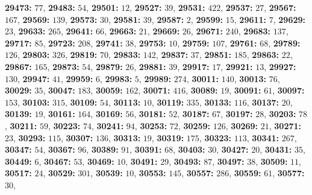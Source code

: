 \textsf{\bfseries 29473:} $77$, \textsf{\bfseries 29483:} $54$, \textsf{\bfseries 29501:} $12$, \textsf{\bfseries 29527:} $39$, \textsf{\bfseries 29531:} $422$, \textsf{\bfseries 29537:} $27$, \textsf{\bfseries 29567:} $167$, \textsf{\bfseries 29569:} $139$, \textsf{\bfseries 29573:} $30$, \textsf{\bfseries 29581:} $39$, \textsf{\bfseries 29587:} $2$, \textsf{\bfseries 29599:} $15$, \textsf{\bfseries 29611:} $7$, \textsf{\bfseries 29629:} $23$, \textsf{\bfseries 29633:} $265$, \textsf{\bfseries 29641:} $66$, \textsf{\bfseries 29663:} $21$, \textsf{\bfseries 29669:} $26$, \textsf{\bfseries 29671:} $240$, \textsf{\bfseries 29683:} $137$, \textsf{\bfseries 29717:} $85$, \textsf{\bfseries 29723:} $208$, \textsf{\bfseries 29741:} $38$, \textsf{\bfseries 29753:} $10$, \textsf{\bfseries 29759:} $107$, \textsf{\bfseries 29761:} $68$, \textsf{\bfseries 29789:} $126$, \textsf{\bfseries 29803:} $326$, \textsf{\bfseries 29819:} $70$, \textsf{\bfseries 29833:} $142$, \textsf{\bfseries 29837:} $37$, \textsf{\bfseries 29851:} $185$, \textsf{\bfseries 29863:} $22$, \textsf{\bfseries 29867:} $165$, \textsf{\bfseries 29873:} $54$, \textsf{\bfseries 29879:} $26$, \textsf{\bfseries 29881:} $39$, \textsf{\bfseries 29917:} $17$, \textsf{\bfseries 29921:} $13$, \textsf{\bfseries 29927:} $130$, \textsf{\bfseries 29947:} $41$, \textsf{\bfseries 29959:} $6$, \textsf{\bfseries 29983:} $5$, \textsf{\bfseries 29989:} $274$, \textsf{\bfseries 30011:} $140$, \textsf{\bfseries 30013:} $76$, \textsf{\bfseries 30029:} $35$, \textsf{\bfseries 30047:} $183$, \textsf{\bfseries 30059:} $162$, \textsf{\bfseries 30071:} $416$, \textsf{\bfseries 30089:} $19$, \textsf{\bfseries 30091:} $61$, \textsf{\bfseries 30097:} $153$, \textsf{\bfseries 30103:} $315$, \textsf{\bfseries 30109:} $54$, \textsf{\bfseries 30113:} $10$, \textsf{\bfseries 30119:} $335$, \textsf{\bfseries 30133:} $116$, \textsf{\bfseries 30137:} $20$, \textsf{\bfseries 30139:} $19$, \textsf{\bfseries 30161:} $164$, \textsf{\bfseries 30169:} $56$, \textsf{\bfseries 30181:} $52$, \textsf{\bfseries 30187:} $67$, \textsf{\bfseries 30197:} $28$, \textsf{\bfseries 30203:} $78$, \textsf{\bfseries 30211:} $59$, \textsf{\bfseries 30223:} $74$, \textsf{\bfseries 30241:} $94$, \textsf{\bfseries 30253:} $72$, \textsf{\bfseries 30259:} $126$, \textsf{\bfseries 30269:} $21$, \textsf{\bfseries 30271:} $23$, \textsf{\bfseries 30293:} $115$, \textsf{\bfseries 30307:} $136$, \textsf{\bfseries 30313:} $19$, \textsf{\bfseries 30319:} $175$, \textsf{\bfseries 30323:} $113$, \textsf{\bfseries 30341:} $267$, \textsf{\bfseries 30347:} $54$, \textsf{\bfseries 30367:} $96$, \textsf{\bfseries 30389:} $91$, \textsf{\bfseries 30391:} $68$, \textsf{\bfseries 30403:} $30$, \textsf{\bfseries 30427:} $20$, \textsf{\bfseries 30431:} $35$, \textsf{\bfseries 30449:} $6$, \textsf{\bfseries 30467:} $53$, \textsf{\bfseries 30469:} $10$, \textsf{\bfseries 30491:} $29$, \textsf{\bfseries 30493:} $87$, \textsf{\bfseries 30497:} $38$, \textsf{\bfseries 30509:} $11$, \textsf{\bfseries 30517:} $24$, \textsf{\bfseries 30529:} $301$, \textsf{\bfseries 30539:} $10$, \textsf{\bfseries 30553:} $145$, \textsf{\bfseries 30557:} $286$, \textsf{\bfseries 30559:} $61$, \textsf{\bfseries 30577:} $30$, 
